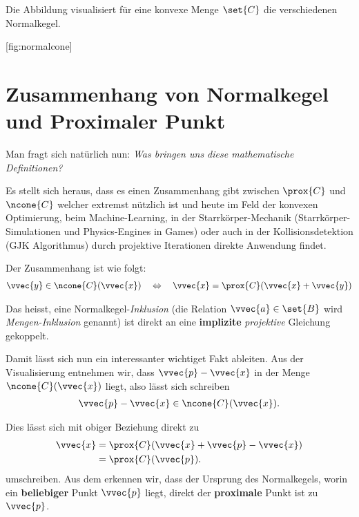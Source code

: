 \documentclass[
  12pt,
  british,
  a4paper,
  twoside,
  titlepage,
  openright,
  numbers=noenddot,
  chapterprefix=true,
  headings=optiontohead,
  svgnames,
  dvipsnames]{scrreprt}
\begin{document}
Die Abbildung  visualisiert für eine konvexe
Menge \(\set{C}\) die verschiedenen Normalkegel.

[fig:normalcone]

\hypertarget{zusammenhang-von-normalkegel-und-proximaler-punkt}{%
\section{Zusammenhang von Normalkegel und Proximaler
Punkt}\label{zusammenhang-von-normalkegel-und-proximaler-punkt}}

Man fragt sich natürlich nun: \emph{Was bringen uns diese mathematische
Definitionen?}

Es stellt sich heraus, dass es einen Zusammenhang gibt zwischen
\(\prox{C}\) und \(\ncone{C}\) welcher extremst nützlich ist und heute
im Feld der konvexen Optimierung, beim Machine-Learning, in der
Starrkörper-Mechanik (Starrkörper-Simulationen und Physics-Engines in
Games) oder auch in der Kollisionsdetektion (GJK Algorithmus) durch
projektive Iterationen direkte Anwendung findet.

Der Zusammenhang ist wie folgt:
\begin{align} \vvec{y} \in \ncone{C}(\vvec{x}) \quad \Leftrightarrow \quad \vvec{x} = \prox{C}(\vvec{x} + \vvec{y}) \label{eq:prox-to-ncone} \end{align}

Das heisst, eine Normalkegel-\emph{Inklusion} (die Relation
\(\vvec{a} \in \set{B}\) wird \emph{Mengen-Inklusion} genannt) ist
direkt an eine \textbf{implizite} \emph{projektive} Gleichung gekoppelt.

Damit lässt sich nun ein interessanter wichtiget Fakt ableiten. Aus der
Visualisierung  entnehmen wir, dass
\(\vvec{p}-\vvec{x}\) in der Menge \(\ncone{C}(\vvec{x})\) liegt, also
lässt sich schreiben
\begin{align} \vvec{p}-\vvec{x} \in \ncone{C}(\vvec{x}). \end{align}

Dies lässt sich mit obiger Beziehung direkt zu
\begin{align} \vvec{x} &= \prox{C}(\vvec{x} + \vvec{p} - \vvec{x}) \\ &= \prox{C}(\vvec{p}). \end{align}
umschreiben. Aus dem erkennen wir, dass der Ursprung des Normalkegels,
worin ein \textbf{beliebiger} Punkt \(\vvec{p}\) liegt, direkt der
\textbf{proximale} Punkt ist zu \(\vvec{p}\).
\end{document}
